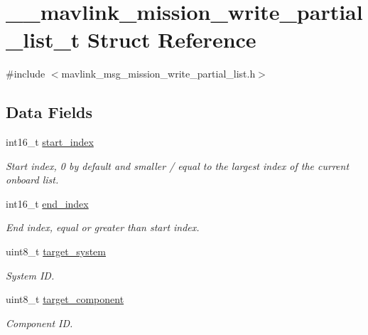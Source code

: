 \hypertarget{struct____mavlink__mission__write__partial__list__t}{\section{\+\_\+\+\_\+mavlink\+\_\+mission\+\_\+write\+\_\+partial\+\_\+list\+\_\+t Struct Reference}
\label{struct____mavlink__mission__write__partial__list__t}
}


{\ttfamily \#include $<$mavlink\+\_\+msg\+\_\+mission\+\_\+write\+\_\+partial\+\_\+list.\+h$>$}

\subsection*{Data Fields}
\begin{DoxyCompactItemize}
\item 
int16\+\_\+t \hyperlink{struct____mavlink__mission__write__partial__list__t_a7001c48ce5da88acadbcbe40a56a0e43}{start\+\_\+index}
\begin{DoxyCompactList}\small\item\em Start index, 0 by default and smaller / equal to the largest index of the current onboard list. \end{DoxyCompactList}\item 
int16\+\_\+t \hyperlink{struct____mavlink__mission__write__partial__list__t_a98971b77ca596d8a92837a0836abf489}{end\+\_\+index}
\begin{DoxyCompactList}\small\item\em End index, equal or greater than start index. \end{DoxyCompactList}\item 
uint8\+\_\+t \hyperlink{struct____mavlink__mission__write__partial__list__t_aa5e77ea55d7e908035fab2d1b0beb898}{target\+\_\+system}
\begin{DoxyCompactList}\small\item\em System I\+D. \end{DoxyCompactList}\item 
uint8\+\_\+t \hyperlink{struct____mavlink__mission__write__partial__list__t_a3e0c142d5a465fe2bf22e8c728be4a58}{target\+\_\+component}
\begin{DoxyCompactList}\small\item\em Component I\+D. \end{DoxyCompactList}\end{DoxyCompactItemize}


